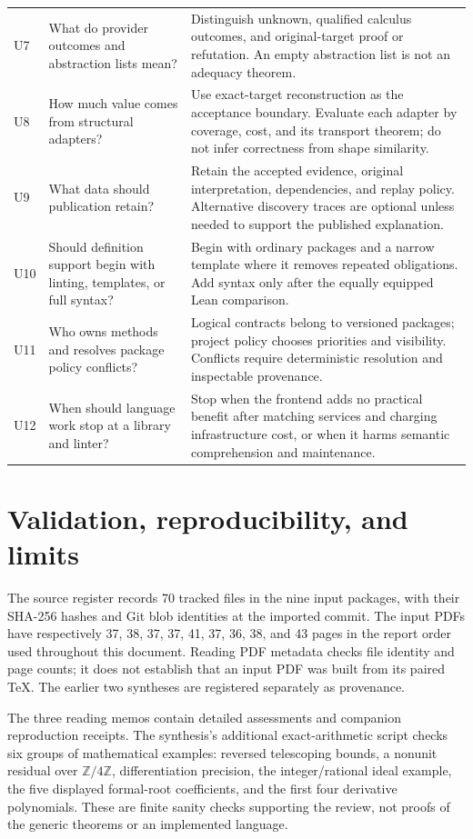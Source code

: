 \documentclass[11pt,letterpaper]{article}
\newcommand{\Z}{\mathbb Z}
\begin{document}
{\begin{longtable}{@{}P{.35in}P{2.05in}P{3.65in}@{}}
U7 & What do provider outcomes and abstraction lists mean? & Distinguish
unknown, qualified calculus outcomes, and original-target proof or refutation.
An empty abstraction list is not an adequacy theorem.\\
U8 & How much value comes from structural adapters? & Use exact-target
reconstruction as the acceptance boundary. Evaluate each adapter by coverage,
cost, and its transport theorem; do not infer correctness from shape similarity.\\
U9 & What data should publication retain? & Retain the accepted evidence,
original interpretation, dependencies, and replay policy. Alternative discovery
traces are optional unless needed to support the published explanation.\\
U10 & Should definition support begin with linting, templates, or full syntax? &
Begin with ordinary packages and a narrow template where it removes repeated
obligations. Add syntax only after the equally equipped Lean comparison.\\
U11 & Who owns methods and resolves package policy conflicts? & Logical
contracts belong to versioned packages; project policy chooses priorities and
visibility. Conflicts require deterministic resolution and inspectable provenance.\\
U12 & When should language work stop at a library and linter? & Stop when the
frontend adds no practical benefit after matching services and charging
infrastructure cost, or when it harms semantic comprehension and maintenance.\\
\end{longtable}}

\clearpage
\section{Validation, reproducibility, and limits}\label{app:validation}
The source register records 70 tracked files in the nine input packages, with
their SHA-256 hashes and Git blob identities at the imported commit. The input
PDFs have respectively 37, 38, 37, 37, 41, 37, 36, 38, and 43 pages in the report
order used throughout this document. Reading PDF metadata checks file identity
and page counts; it does not establish that an input PDF was built from its
paired TeX. The earlier two syntheses are registered separately as provenance.

The three reading memos contain detailed assessments and companion reproduction
receipts. The synthesis's additional exact-arithmetic script checks six groups
of mathematical examples: reversed telescoping bounds, a nonunit residual over
\(\Z/4\Z\), differentiation precision, the integer/rational ideal example,
the five displayed formal-root coefficients, and the first four derivative
polynomials. These are finite sanity checks supporting the review, not proofs
of the generic theorems or an implemented language.
\end{document}
